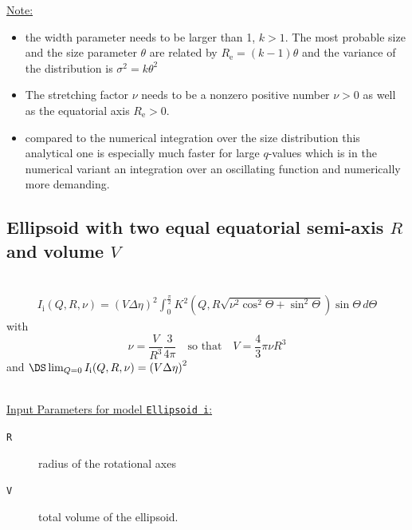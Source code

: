 \uline{Note:}
\begin{itemize}
\item the width parameter needs to be larger than 1, $k>1$. The most probable size and the size parameter $\theta$ are related by $R_\mathrm{e} = (k-1) \theta$ and the variance of the distribution is $\sigma^2 = k \theta^2$
\item The stretching factor $\nu$ needs to be a nonzero positive number $\nu>0$ as well as the equatorial axis $R_\mathrm{e}>0$.
\item compared to the numerical integration over the size distribution this analytical one is especially much faster for large $q$-values which is in the numerical variant an integration over an oscillating function and numerically more demanding.
\end{itemize}

\clearpage
\subsection{Ellipsoid with two equal equatorial semi-axis $R$ and volume $V$}
\label{sect:Ellipsoid_i} ~\\

\begin{align}
I_\text{i}(Q,R,\nu) = \left( V \Delta\eta
\right)^2
 \int_0^{\frac{\pi}{2}}\! K^2\left(Q,R\sqrt{\nu^2\cos^2\Theta+\sin^2\Theta}\right)\sin\Theta\, d\Theta
\end{align}
with
$$
\nu=\frac{V}{R^3}\frac{3}{4\pi} \quad \mbox{so that}\quad V =\frac{4}{3}\pi\nu R^3
$$
and $\DS \lim_{Q=0} I_\text{i}(Q,R,\nu)= \left(V\Delta\eta\right)^2$

~\\
\uline{Input Parameters for model \texttt{Ellipsoid i}:}
\begin{description}
\item[\texttt{R}] radius of the rotational axes
\item[\texttt{V}] total volume of the ellipsoid.
\end{description}

